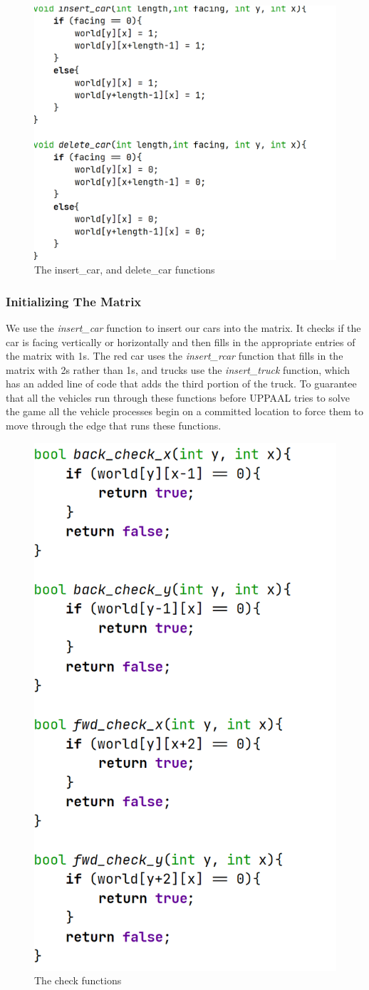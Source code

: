 \documentclass{article}
\begin{document}
\begin{figure}[hbt!]
    \centering
    \includegraphics[width=0.75\linewidth]{images/insertdelete.png}
    \caption{The insert\_car, and delete\_car functions}
\end{figure}

\subsubsection{Initializing The Matrix}
We use the \emph{insert\_car} function to insert our cars into the matrix. It checks if the car is facing vertically or horizontally and then fills in the appropriate entries of the matrix with 1s. The red car uses the \emph{insert\_rcar} function that fills in the matrix with 2s rather than 1s, and trucks use the \emph{insert\_truck} function, which has an added line of code that adds the third portion of the truck. To guarantee that all the vehicles run through these functions before UPPAAL tries to solve the game all the vehicle processes begin on a committed location to force them to move through the edge that runs these functions.

\begin{figure}[hbt!]
    \centering
    \includegraphics[width=0.5\linewidth]{images/checks.png}
    \caption{The check functions}
\end{figure}
\end{document}
